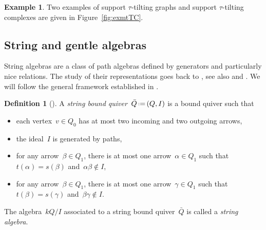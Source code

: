 \documentclass{amsart}
\theoremstyle{definition}
\newtheorem{definition}[theorem]{Definition}
\newtheorem{example}[theorem]{Example}
\newcommand{\eqdef}{\mbox{\,\raisebox{0.2ex}{\scriptsize\ensuremath{\mathrm:}}\ensuremath{=}\,}} %
\newcommand{\darkblue}{\color{darkblue}} %
\newcommand{\defn}[1]{\textsl{\darkblue #1}} %
\begin{document}
\begin{example}
 Two examples of support $\tau$-tilting graphs and support $\tau$-tilting complexes are given in Figure~\ref{fig:exmtTC}.
\end{example}

\subsection{String and gentle algebras}
\label{subsec:stringGentleAlgebra}

String algebras are a class of path algebras defined by generators and particularly nice relations.
The study of their representations goes back to \cite{GelfandPonomarev}, see also \cite{DonovanFreislich} and \cite{WaldWaschbusch}.
We will follow the general framework established in \cite{ButlerRingel}.

\begin{definition}[\cite{ButlerRingel}]
A \defn{string bound quiver}~$\bar Q \eqdef (Q,I)$ is a bound quiver such that
\begin{itemize}
\item each vertex~$v \in Q_0$ has at most two incoming and two outgoing arrows,
\item the ideal~$I$ is generated by paths,
\item for any arrow~$\beta \in Q_1$, there is at most one arrow~$\alpha \in Q_1$ such that~$t(\alpha) = s(\beta)$ and~$\alpha\beta\notin I$,
\item for any arrow~$\beta \in Q_1$, there is at most one arrow~$\gamma \in Q_1$ such that~$t(\beta) = s(\gamma)$ and~$\beta\gamma\notin I$.
\end{itemize}
The algebra~$kQ/I$ associated to a string bound quiver~$\bar Q$ is called a \defn{string algebra}.
\end{definition}
\end{document}

